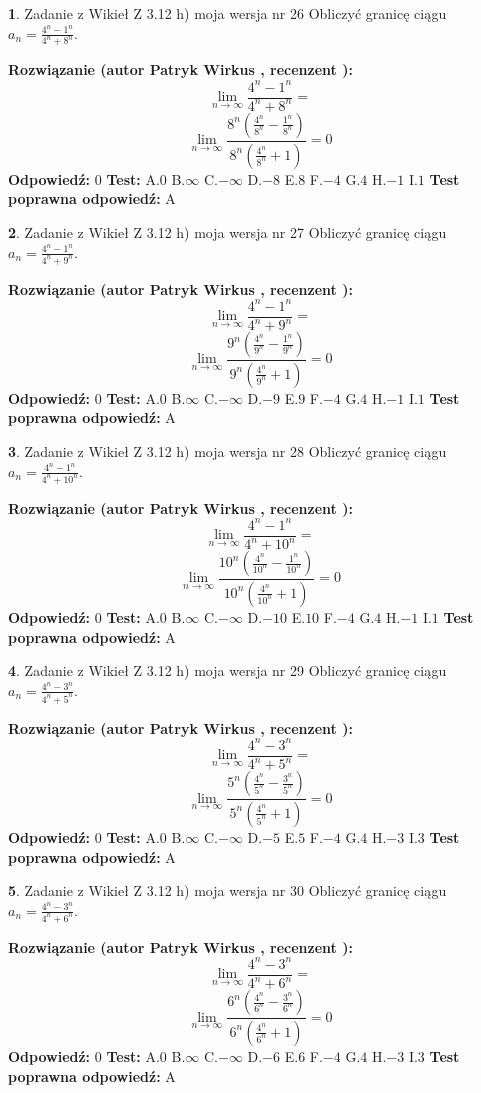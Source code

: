 \documentclass[12pt, a4paper]{article}
\theoremstyle{definition} %
\newtheorem{zad}{}
\newcommand{\zadStart}[1]{\begin{zad}#1\newline}
\newcommand{\zadStop}{\end{zad}}
\newcommand{\rozwStart}[2]{\noindent \textbf{Rozwiązanie (autor #1 , recenzent #2): }\newline}
\newcommand{\rozwStop}{\newline}
\newcommand{\odpStart}{\noindent \textbf{Odpowiedź:}\newline}
\newcommand{\odpStop}{\newline}
\newcommand{\testStart}{\noindent \textbf{Test:}\newline}
\newcommand{\testStop}{\newline}
\newcommand{\kluczStart}{\noindent \textbf{Test poprawna odpowiedź:}\newline}
\newcommand{\kluczStop}{\newline}
\begin{document}
\zadStart{Zadanie z Wikieł Z 3.12 h) moja wersja nr 26}
Obliczyć granicę ciągu $a_{n}=\frac{4^{n} - 1^{n}}{4^{n} + 8^{n}}$.
\zadStop
\rozwStart{Patryk Wirkus}{}
$$\lim\limits_{n\to\infty}\frac{4^{n} - 1^{n}}{4^{n} + 8^{n}}=$$
$$\lim\limits_{n\to\infty}\frac{8^{n}(\frac{4^{n}}{8^{n}} - \frac{1^{n}}{8^{n}})}{8^{n}(\frac{4^{n}}{8^{n}} + 1)} = 0$$
\rozwStop
\odpStart
$0$
\odpStop
\testStart
A.$0$
B.$\infty$
C.$-\infty$
D.$-8$
E.$8$
F.$-4$
G.$4$
H.$-1$
I.$1$
\testStop
\kluczStart
A
\kluczStop



\zadStart{Zadanie z Wikieł Z 3.12 h) moja wersja nr 27}
Obliczyć granicę ciągu $a_{n}=\frac{4^{n} - 1^{n}}{4^{n} + 9^{n}}$.
\zadStop
\rozwStart{Patryk Wirkus}{}
$$\lim\limits_{n\to\infty}\frac{4^{n} - 1^{n}}{4^{n} + 9^{n}}=$$
$$\lim\limits_{n\to\infty}\frac{9^{n}(\frac{4^{n}}{9^{n}} - \frac{1^{n}}{9^{n}})}{9^{n}(\frac{4^{n}}{9^{n}} + 1)} = 0$$
\rozwStop
\odpStart
$0$
\odpStop
\testStart
A.$0$
B.$\infty$
C.$-\infty$
D.$-9$
E.$9$
F.$-4$
G.$4$
H.$-1$
I.$1$
\testStop
\kluczStart
A
\kluczStop



\zadStart{Zadanie z Wikieł Z 3.12 h) moja wersja nr 28}
Obliczyć granicę ciągu $a_{n}=\frac{4^{n} - 1^{n}}{4^{n} + 10^{n}}$.
\zadStop
\rozwStart{Patryk Wirkus}{}
$$\lim\limits_{n\to\infty}\frac{4^{n} - 1^{n}}{4^{n} + 10^{n}}=$$
$$\lim\limits_{n\to\infty}\frac{10^{n}(\frac{4^{n}}{10^{n}} - \frac{1^{n}}{10^{n}})}{10^{n}(\frac{4^{n}}{10^{n}} + 1)} = 0$$
\rozwStop
\odpStart
$0$
\odpStop
\testStart
A.$0$
B.$\infty$
C.$-\infty$
D.$-10$
E.$10$
F.$-4$
G.$4$
H.$-1$
I.$1$
\testStop
\kluczStart
A
\kluczStop



\zadStart{Zadanie z Wikieł Z 3.12 h) moja wersja nr 29}
Obliczyć granicę ciągu $a_{n}=\frac{4^{n} - 3^{n}}{4^{n} + 5^{n}}$.
\zadStop
\rozwStart{Patryk Wirkus}{}
$$\lim\limits_{n\to\infty}\frac{4^{n} - 3^{n}}{4^{n} + 5^{n}}=$$
$$\lim\limits_{n\to\infty}\frac{5^{n}(\frac{4^{n}}{5^{n}} - \frac{3^{n}}{5^{n}})}{5^{n}(\frac{4^{n}}{5^{n}} + 1)} = 0$$
\rozwStop
\odpStart
$0$
\odpStop
\testStart
A.$0$
B.$\infty$
C.$-\infty$
D.$-5$
E.$5$
F.$-4$
G.$4$
H.$-3$
I.$3$
\testStop
\kluczStart
A
\kluczStop



\zadStart{Zadanie z Wikieł Z 3.12 h) moja wersja nr 30}
Obliczyć granicę ciągu $a_{n}=\frac{4^{n} - 3^{n}}{4^{n} + 6^{n}}$.
\zadStop
\rozwStart{Patryk Wirkus}{}
$$\lim\limits_{n\to\infty}\frac{4^{n} - 3^{n}}{4^{n} + 6^{n}}=$$
$$\lim\limits_{n\to\infty}\frac{6^{n}(\frac{4^{n}}{6^{n}} - \frac{3^{n}}{6^{n}})}{6^{n}(\frac{4^{n}}{6^{n}} + 1)} = 0$$
\rozwStop
\odpStart
$0$
\odpStop
\testStart
A.$0$
B.$\infty$
C.$-\infty$
D.$-6$
E.$6$
F.$-4$
G.$4$
H.$-3$
I.$3$
\testStop
\kluczStart
A
\kluczStop
\end{document}
